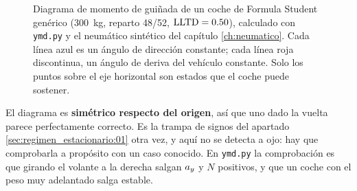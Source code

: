 \begin{figure}[htbp]
\centering
{}
\caption[Diagrama de momento de guiñada]{Diagrama de momento de guiñada de un
coche de Formula Student genérico (\SI{300}{\kilogram}, reparto \num{48}/\num{52},
$\mathrm{LLTD} = \num{0.50}$), calculado con \texttt{ymd.py} y el neumático sintético
del capítulo \ref{ch:neumatico}. Cada línea azul es un ángulo de dirección
constante; cada línea roja discontinua, un ángulo de deriva del vehículo
constante. Solo los puntos sobre el eje horizontal son estados que el coche
puede sostener.}
\label{fig:ymd:diagrama}
\end{figure}

\begin{ojo}
El diagrama es \textbf{simétrico respecto del origen}, así que uno dado la
vuelta parece perfectamente correcto. Es la trampa de signos del apartado
\ref{sec:regimen_estacionario:01} otra vez, y aquí no se detecta a ojo: hay que
comprobarla a propósito con un caso conocido. En \texttt{ymd.py} la
comprobación es que girando el volante a la derecha salgan $a_y$ y $N$
positivos, y que un coche con el peso muy adelantado salga estable.
\end{ojo}

